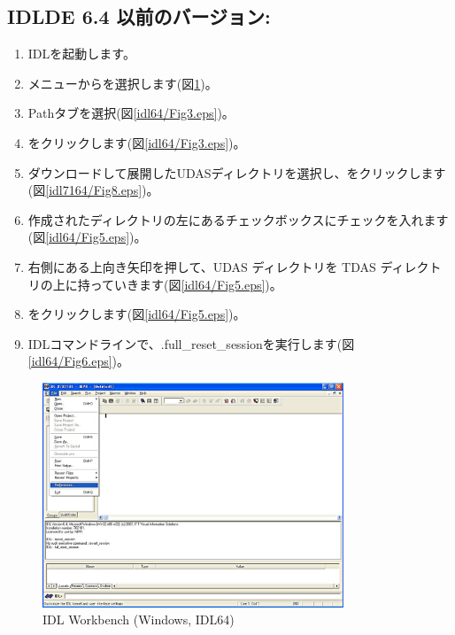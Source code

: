\documentclass[a4j]{jbook}
\begin{document}
\subsection{IDLDE 6.4  以前のバージョン:}
\begin{enumerate}
\item IDLを起動します。
\item {}メニューからを選択します(図\ref{idl64/Fig2.eps})。
\item Pathタブを選択(図\ref{idl64/Fig3.eps})。
\item {}をクリックします(図\ref{idl64/Fig3.eps})。
\item ダウンロードして展開したUDASディレクトリを選択し、をクリックします(図\ref{idl7164/Fig8.eps})。
\item 作成されたディレクトリの左にあるチェックボックスにチェックを入れます(図\ref{idl64/Fig5.eps})。
\item 右側にある上向き矢印を押して、UDAS ディレクトリを TDAS ディレクトリの上に持っていきます(図\ref{idl64/Fig5.eps})。
\item {}をクリックします(図\ref{idl64/Fig5.eps})。
\item IDLコマンドラインで、.full\_reset\_sessionを実行します(図\ref{idl64/Fig6.eps})。
\end{enumerate}


\begin{figure}[H]
\begin{center}
\includegraphics[width=9cm]{fig_idl64/Fig2.eps}
\caption{IDL Workbench (Windows, IDL64)}
\label{idl64/Fig2.eps}
\end{center}
\end{figure}
\end{document}
